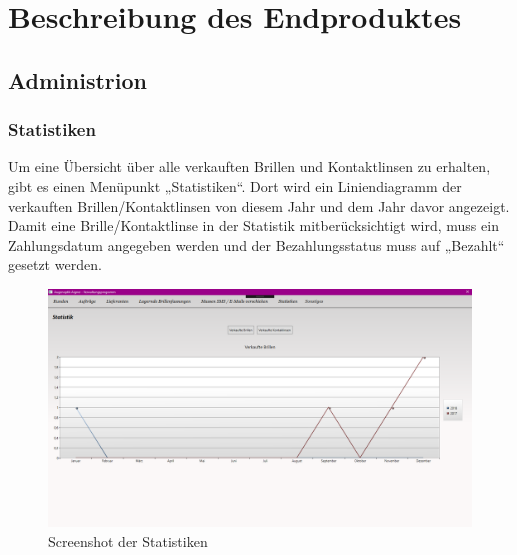 \chapter{Beschreibung des Endproduktes}\label{cha:theoretical-background}
\section{Administrion}
\subsection{Statistiken}
Um eine Übersicht über alle verkauften Brillen und Kontaktlinsen zu erhalten, gibt es einen Menüpunkt „Statistiken“. Dort wird ein Liniendiagramm der verkauften Brillen/Kontaktlinsen von diesem Jahr und dem Jahr davor angezeigt. Damit eine Brille/Kontaktlinse in der Statistik mitberücksichtigt wird, muss ein Zahlungsdatum angegeben werden und der Bezahlungsstatus muss auf „Bezahlt“ gesetzt werden.
\begin{figure}
\begin{center}
	\includegraphics[scale=.4]{images/Statistiken.png}
\end{center}
	\caption{Screenshot der Statistiken}
	\label{fig:sample}
\end{figure}
